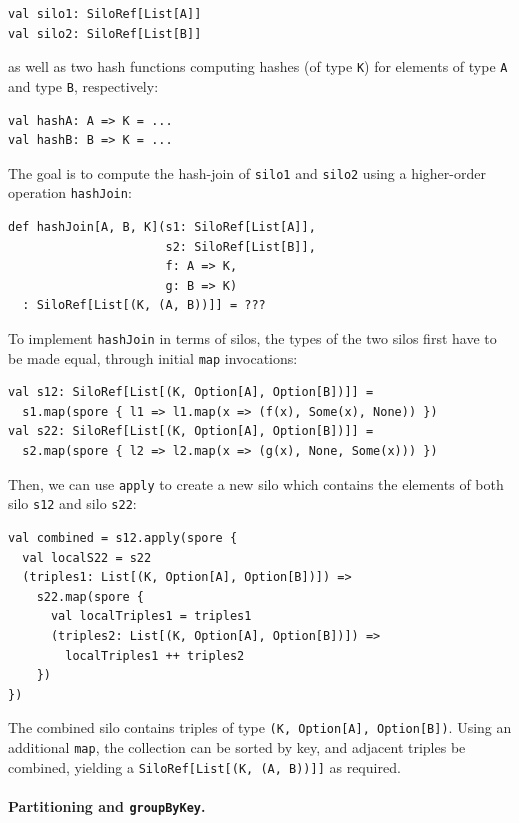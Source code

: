 \documentclass{jfp1}
\begin{document}
\begin{lstlisting}
val silo1: SiloRef[List[A]]
val silo2: SiloRef[List[B]]
\end{lstlisting}
\noindent
as well as two hash functions computing hashes (of type \verb|K|) for elements
of type \verb|A| and type \verb|B|, respectively:

\begin{lstlisting}
val hashA: A => K = ...
val hashB: B => K = ...
\end{lstlisting}
\noindent
The goal is to compute the hash-join of \verb|silo1| and \verb|silo2| using a
higher-order operation \verb|hashJoin|:

\begin{lstlisting}
def hashJoin[A, B, K](s1: SiloRef[List[A]],
                      s2: SiloRef[List[B]],
                      f: A => K,
                      g: B => K)
  : SiloRef[List[(K, (A, B))]] = ???
\end{lstlisting}
\noindent
To implement \verb|hashJoin| in terms of silos, the types of the two silos first
have to be made equal, through initial \verb|map| invocations:

\begin{lstlisting}
val s12: SiloRef[List[(K, Option[A], Option[B])]] =
  s1.map(spore { l1 => l1.map(x => (f(x), Some(x), None)) })
val s22: SiloRef[List[(K, Option[A], Option[B])]] =
  s2.map(spore { l2 => l2.map(x => (g(x), None, Some(x))) })
\end{lstlisting}
\noindent
Then, we can use \verb|apply| to create a new silo which contains the elements
of both silo \verb|s12| and silo \verb|s22|:

\begin{lstlisting}
val combined = s12.apply(spore {
  val localS22 = s22
  (triples1: List[(K, Option[A], Option[B])]) =>
    s22.map(spore {
      val localTriples1 = triples1
      (triples2: List[(K, Option[A], Option[B])]) =>
        localTriples1 ++ triples2
    })
})
\end{lstlisting}
\noindent
The combined silo contains triples of type \verb|(K, Option[A], Option[B])|.
Using an additional \verb|map|, the collection can be sorted by key, and
adjacent triples be combined, yielding a \texttt{SiloRef[List[(K, (A, B))]]} as
required.

\paragraph{Partitioning and \texttt{groupByKey}.}
\end{document}
